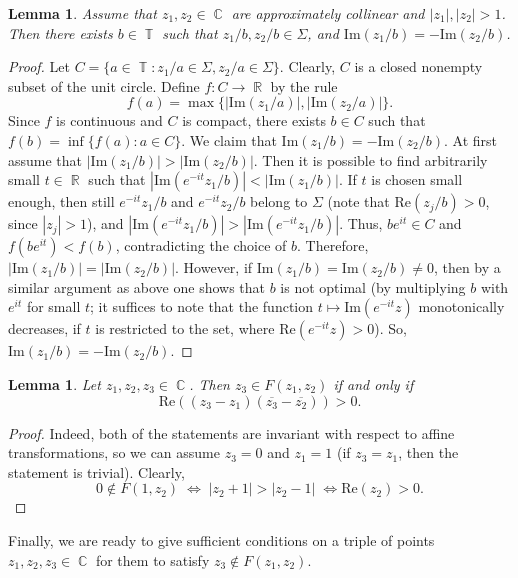 \documentclass{amsart}
\numberwithin{equation}{section}
\newtheorem{lemma}[theorem]{Lemma}
\theoremstyle{definition}
\theoremstyle{remark}
\DeclareMathOperator{\CC}{\mathbb C}
\DeclareMathOperator{\RR}{\mathbb R}
\DeclareMathOperator{\TT}{\mathbb T}
\begin{document}
	\begin{lemma}\label{lemEqualImagPartsInStrip}
		Assume that $z_1,z_2 \in \CC$ are approximately collinear and $|z_1|, |z_2| > 1$. Then there exists $b \in \TT$ such that $z_1/b, z_2/b \in \Sigma$, and $\mathrm{Im}(z_1/b) = -\mathrm{Im}(z_2/b)$.
	\end{lemma}
	\begin{proof}
		Let $C = \{a \in \TT: z_1/a \in \Sigma, z_2/a \in \Sigma\}$. Clearly, $C$ is a closed nonempty subset of the unit circle. Define $f:C \to \RR$ by the rule 
		\[
		f(a) = \max\{|\mathrm{Im}(z_1/a)|, |\mathrm{Im}(z_2/a)|\}.
		\]
		Since $f$ is continuous and $C$ is compact, there exists $b \in C$ such that $f(b) = \inf \{f(a): a \in C\}$. We claim that $\mathrm{Im}(z_1/b) = -\mathrm{Im}(z_2/b)$. At first assume that $|\mathrm{Im}(z_1/b)| > |\mathrm{Im}(z_2/b)|$. Then it is possible to find arbitrarily small $t \in \RR$ such that $|\mathrm{Im}(e^{-it}z_1/b)|<|\mathrm{Im}(z_1/b)|$. If $t$ is chosen small enough, then still $ e^{-it}z_1/b$ and $e^{-it}z_2/b$ belong to $\Sigma$ (note that $\mathrm{Re}(z_j/b) > 0$, since $|z_j| > 1$), and $|\mathrm{Im}(e^{-it}z_1/b)|>|\mathrm{Im}(e^{-it}z_1/b)|$. Thus, $be^{it} \in C$ and $f(be^{it}) < f(b)$, contradicting the choice of $b$. Therefore, $|\mathrm{Im}(z_1/b)| = |\mathrm{Im}(z_2/b)|$. However, if $\mathrm{Im}(z_1/b) = \mathrm{Im}(z_2/b) \ne 0$, then by a similar argument as above one shows that $b$ is not optimal (by multiplying $b$ with $e^{it}$ for small $t$; it suffices to note that the function $t \mapsto \mathrm{Im}(e^{-it}z)$ monotonically decreases, if $t$ is restricted to the set, where $\mathrm{Re}(e^{-it}z) > 0$). So, $\mathrm{Im}(z_1/b) = -\mathrm{Im}(z_2/b)$.
	\end{proof}
	
	\begin{lemma}\label{lemCriterionForDiscOOnDiameter}
		Let $z_1,z_2,z_3 \in \CC$. Then $z_3 \in F(z_1,z_2)$ if and only if \[\mathrm{Re}\left((z_3 - z_1)(\overline{z_3} - \overline{z_2})\right) > 0.\]
	\end{lemma}
	\begin{proof}
		Indeed, both of the statements are invariant with respect to affine transformations, so we can assume $z_3 = 0$ and $z_1 = 1$ (if $z_3 = z_1$, then the statement is trivial). Clearly, 
		\[
		0 \notin F(1, z_2) \; \Leftrightarrow \; |z_2 + 1| > |z_2 - 1| \; \Leftrightarrow \mathrm{Re}(z_2) > 0.
		\]
	\end{proof}

	Finally, we are ready to give sufficient conditions on a triple of points $z_1,z_2,z_3 \in \CC$ for them to satisfy $z_3 \notin F(z_1, z_2)$.
	
\end{document}
